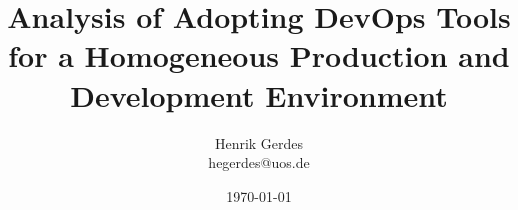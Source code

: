 

\title[Development with DevContainers]{Analysis of Adopting DevOps Tools for a Homogeneous Production and Development Environment}

\author[Henrik Gerdes]{Henrik Gerdes\\ {\scriptsize hegerdes@uos.de}}

\date{\today}

